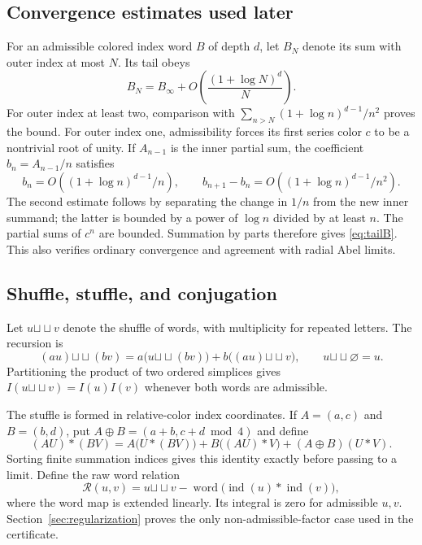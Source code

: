 \documentclass[11pt,letterpaper]{article}
\numberwithin{equation}{section}
\theoremstyle{definition}
\newcommand{\sh}{\mathbin{\sha}}
\providecommand{\sha}{\mathbin{\sqcup\!\sqcup}}
\newcommand{\word}{\operatorname{word}}
\newcommand{\ind}{\operatorname{ind}}
\begin{document}
\subsection{Convergence estimates used later}
For an admissible colored index word $B$ of depth $d$, let $B_N$ denote
its sum with outer index at most $N$. Its tail obeys
\begin{equation}
 B_N=B_\infty+O\!\left(\frac{(1+\log N)^d}{N}\right).
 \label{eq:tailB}
\end{equation}
For outer index at least two, comparison with
$\sum_{n>N}(1+\log n)^{d-1}/n^2$ proves the bound. For outer index one,
admissibility forces its first series color $c$ to be a nontrivial root
of unity. If $A_{n-1}$ is the inner partial sum, the coefficient
$b_n=A_{n-1}/n$ satisfies
\[
 b_n=O((1+\log n)^{d-1}/n),\qquad
 b_{n+1}-b_n=O((1+\log n)^{d-1}/n^2).
\]
The second estimate follows by separating the change in $1/n$ from the
new inner summand; the latter is bounded by a power of $\log n$ divided
by at least $n$. The partial sums of $c^n$ are bounded. Summation by parts
therefore gives \eqref{eq:tailB}. This also verifies ordinary convergence
and agreement with radial Abel limits.

\subsection{Shuffle, stuffle, and conjugation}
Let $u\sh v$ denote the shuffle of words, with multiplicity for repeated
letters. The recursion is
\begin{equation}
 (au)\sh(bv)=a\bigl(u\sh(bv)\bigr)+b\bigl((au)\sh v\bigr),
 \qquad u\sh\varnothing=u.
 \label{eq:shuffle}
\end{equation}
Partitioning the product of two ordered simplices gives
$I(u\sh v)=I(u)I(v)$ whenever both words are admissible.

The stuffle is formed in relative-color index coordinates. If
$A=(a,c)$ and $B=(b,d)$, put $A\oplus B=(a+b,c+d\bmod4)$ and define
\begin{equation}
 (AU)*(BV)=A\bigl(U*(BV)\bigr)+B\bigl((AU)*V\bigr)
             +(A\oplus B)(U*V).
 \label{eq:stuffle}
\end{equation}
Sorting finite summation indices gives this identity exactly before
passing to a limit. Define the raw word relation
\begin{equation}
 \mathcal R(u,v)=u\sh v-
 \word\bigl(\ind(u)*\ind(v)\bigr),
 \label{eq:rawDS}
\end{equation}
where the word map is extended linearly. Its integral is zero for
admissible $u,v$. Section~\ref{sec:regularization} proves the only
non-admissible-factor case used in the certificate.
\end{document}
